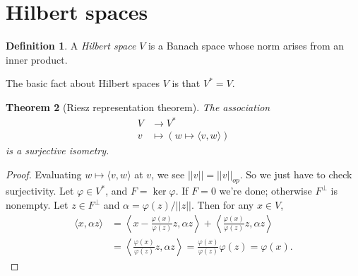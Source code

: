 \documentclass[12pt]{report}
\newcommand{\dfn}[1]{\emph{#1}\index{#1}}
\newtheorem{theorem}{Theorem}[chapter]
\theoremstyle{definition}
\newtheorem{definition}[theorem]{Definition}
\begin{document}
\section{Hilbert spaces}
    \begin{definition}
    A \dfn{Hilbert space} $V$ is a Banach space whose norm arises from an inner product.
    \end{definition}
    The basic fact about Hilbert spaces $V$ is that $V^* = V$.
\begin{theorem}[Riesz representation theorem]
    The association
\begin{align*}
    V &\to V^*\\
    v &\mapsto (w \mapsto \langle v, w\rangle)
\end{align*}
    is a surjective isometry.
\end{theorem}
\begin{proof}
    Evaluating $w \mapsto \langle v, w\rangle$ at $v$, we see $||v|| = ||v||_{op}$. So we just have to check surjectivity. Let $\varphi \in V^*$, and $F = \ker \varphi$. If $F = 0$ we're done; otherwise $F^\perp$ is nonempty. Let $z \in F^\perp$ and $\alpha = \varphi(z)/||z||$. Then for any $x \in V$,
    \begin{align*}
        \langle x, \alpha z\rangle  &=  \left\langle x - \frac{\varphi(x)}{\varphi(z)} z, \alpha z\right\rangle + \left\langle \frac{\varphi(x)}{\varphi(z)}z, \alpha z\right\rangle \\&= \left\langle \frac{\varphi(x)}{\varphi(z)}z, \alpha z\right\rangle
            = \frac{\varphi(x)}{\varphi(z)} \varphi(z) = \varphi(x).
    \end{align*}
\end{proof}
\end{document}
